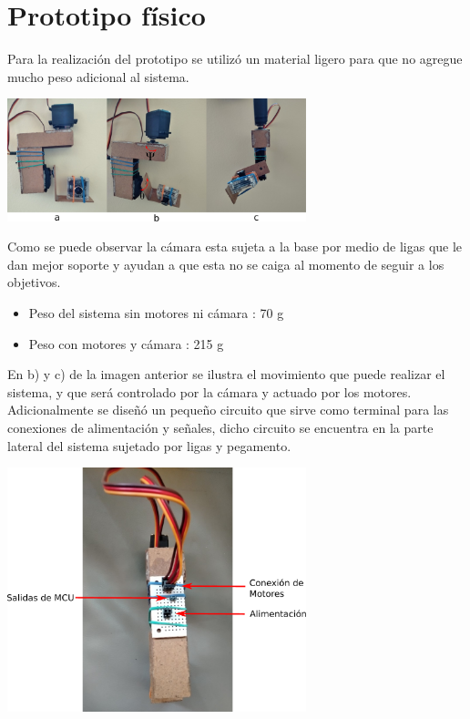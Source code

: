 \section{Prototipo físico}
Para la realización del prototipo se utilizó un material ligero para que no agregue mucho peso adicional al sistema.
\begin{center}
	\includegraphics[width=0.65\textwidth]{Contenido/Cuerpo/Capitulo5/Fig17.eps}
	\label{Fig1}
\end{center}
Como se puede observar la cámara esta sujeta a la base por medio de ligas que le dan mejor soporte y ayudan a que
esta no se caiga al momento de seguir a los objetivos.
\begin{itemize}
	\item Peso del sistema sin motores ni cámara : 70 g
	\item Peso con motores y cámara : 215 g
\end{itemize}
En b) y c) de la imagen anterior se ilustra el movimiento que puede realizar el sistema, y que será controlado
por la cámara y actuado por los motores.\\
Adicionalmente se diseñó un pequeño circuito que sirve como terminal para las conexiones de alimentación y señales,
dicho circuito se encuentra en la parte lateral del sistema sujetado por ligas y pegamento.
\begin{center}
	\includegraphics[width=0.65\textwidth]{Contenido/Cuerpo/Capitulo5/Fig18.eps}
	\label{Fig1}
\end{center}


